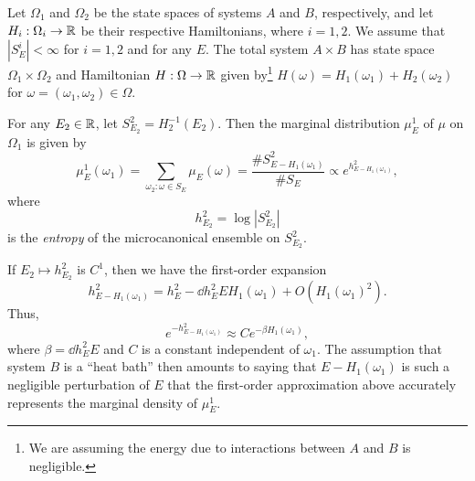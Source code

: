 \begin{example}
Let $\Omega_1$ and $\Omega_2$ be the state spaces of systems $A$ and
$B$, respectively, and let $H_i : \Omega_i \rightarrow {\mathbb R}$ be their respective Hamiltonians,
where $i = 1, 2$. We assume that $|S^i_E| < \infty$ for $i = 1, 2$ and for any $E$.
The total system $A \times B$ has state space $\Omega_1 \times \Omega_2$
and Hamiltonian $H : \Omega \rightarrow {\mathbb R}$ given by\footnote{We are assuming the energy due to interactions
between $A$ and $B$ is negligible.}
$H(\omega) = H_1(\omega_1) + H_2(\omega_2)$
for $\omega = (\omega_1, \omega_2) \in \Omega$.

For any $E_2 \in {\mathbb R}$, let $S^2_{E_2} = H_2^{-1}(E_2)$. Then the marginal distribution $\mu^1_E$
of $\mu$ on $\Omega_1$ is given by
\begin{equation}
\mu^1_E(\omega_1)
  =
\sum_{\omega_2:\omega\in S_E} \mu_E(\omega)
  =
\frac{\# S^2_{E-H_1(\omega_1)}}{\# S_E}
  \propto
e^{h^2_{E-H_1(\omega_1)}},
\end{equation}
where
\begin{equation}
h^2_{E_2} = \log |S^2_{E_2}|
\end{equation}
is the \emph{entropy} of the microcanonical ensemble on $S^2_{E_2}$.

If $E_2 \mapsto h^2_{E_2}$ is $C^1$, then we have the first-order expansion
\begin{equation}
h^2_{E - H_1(\omega_1)}
  =
h^2_E - \dd{h^2_E}{E} H_1(\omega_1) + O(H_1(\omega_1)^2).
\end{equation}
Thus,
\begin{equation}
e^{-h^2_{E-H_1(\omega_1)}}
  \approx
C e^{-\beta H_1(\omega_1)},
\end{equation}
where $\beta = \dd{h^2_E}{E}$ and $C$ is a constant independent of $\omega_1$.
The assumption that system $B$ is a ``heat bath'' then amounts to saying that
$E - H_1(\omega_1)$ is such a negligible perturbation of $E$ that the first-order
approximation above accurately represents the marginal density of $\mu^1_E$.

\end{example}

